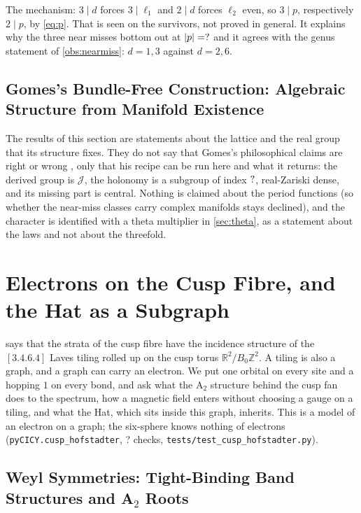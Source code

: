 \documentclass[11pt,a4paper]{article}
\newcommand{\SSHoChecks}{?}\newcommand{\SSHoGapsThird}{?}\newcommand{\SSHoChernThird}{?}
\newcommand{\ZZ}{\mathbb{Z}}
\newcommand{\RR}{\mathbb{R}}
\theoremstyle{plain}
\theoremstyle{definition}
\begin{document}
The mechanism: $3\mid d$ forces $3\mid\ell_1$ and $2\mid d$ forces $\ell_2$ even, so
$3\mid p$, respectively $2\mid p$, by \cref{eq:p}. That is seen on the survivors, not proved in general. It explains why the three near misses bottom out at $|p|=?$ and it
agrees with the genus statement of \cref{obs:nearmiss}: $d=1,3$ against $d=2,6$.

\subsection{Gomes's Bundle-Free Construction: Algebraic Structure from Manifold Existence}

The results of this section are statements about the lattice and the real group
that its structure fixes. They do not say that Gomes's philosophical claims are right or
wrong \cite{Gomes}, only that his recipe can be run here and what it returns:
the derived group is $\mathcal J$, the holonomy is a subgroup of index $?$,
real-Zariski dense, and its missing part is central. Nothing is claimed about the period functions
(so whether the near-miss classes carry complex manifolds stays declined), and the character
is identified with a theta multiplier in \cref{sec:theta}, as a statement about the laws and not about the threefold.


\section{Electrons on the Cusp Fibre, and the Hat as a Subgraph}
\label{sec:hofstadter}

 says that the strata of the cusp fibre have the incidence structure of the
$[3.4.6.4]$ Laves tiling rolled up on the cusp torus $\RR^2/B_0\ZZ^2$. A tiling is also a
graph, and a graph can carry an electron. We put one orbital on every site and a hopping $1$
on every bond, and ask what the A$_2$ structure behind the cusp fan does to the spectrum, how
a magnetic field enters without choosing a gauge on a tiling, and what the Hat, which sits
inside this graph, inherits. This is a model of an electron on a graph; the six-sphere knows
nothing of electrons (\texttt{pyCICY.cusp\_hofstadter}, \SSHoChecks{} checks, \texttt{tests/test\_cusp\_hofstadter.py}).

\subsection{Weyl Symmetries: Tight-Binding Band Structures and A$_2$ Roots}
\end{document}

